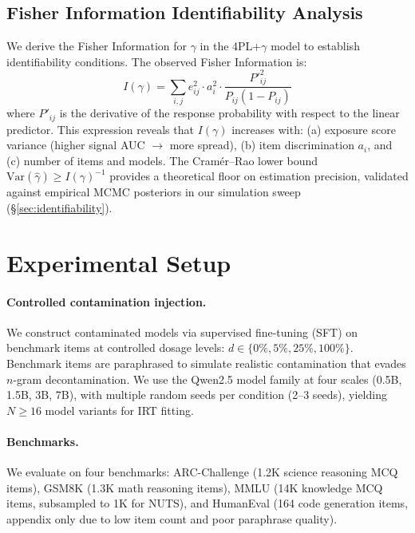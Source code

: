 \documentclass[11pt,a4paper]{article}
\newcommand{\gammahat}{\hat{\gamma}}
\begin{document}
\subsection{Fisher Information Identifiability Analysis}

We derive the Fisher Information for $\gamma$ in the 4PL+$\gamma$ model to establish identifiability conditions. The observed Fisher Information is:
\begin{equation}
I(\gamma) = \sum_{i,j} e_{ij}^2 \cdot a_i^2 \cdot \frac{P'_{ij}^2}{P_{ij}(1-P_{ij})}
\end{equation}
where $P'_{ij}$ is the derivative of the response probability with respect to the linear predictor. This expression reveals that $I(\gamma)$ increases with: (a) exposure score variance (higher signal AUC $\to$ more spread), (b) item discrimination $a_i$, and (c) number of items and models. The Cram\'{e}r--Rao lower bound $\text{Var}(\gammahat) \geq I(\gamma)^{-1}$ provides a theoretical floor on estimation precision, validated against empirical MCMC posteriors in our simulation sweep (\S\ref{sec:identifiability}).

\section{Experimental Setup}
\label{sec:setup}

\paragraph{Controlled contamination injection.}
We construct contaminated models via supervised fine-tuning (SFT) on benchmark items at controlled dosage levels: $d \in \{0\%, 5\%, 25\%, 100\%\}$. Benchmark items are paraphrased to simulate realistic contamination that evades $n$-gram decontamination. We use the Qwen2.5 model family at four scales (0.5B, 1.5B, 3B, 7B), with multiple random seeds per condition (2--3 seeds), yielding $N\geq16$ model variants for IRT fitting.

\paragraph{Benchmarks.}
We evaluate on four benchmarks: ARC-Challenge (1.2K science reasoning MCQ items), GSM8K (1.3K math reasoning items), MMLU (14K knowledge MCQ items, subsampled to 1K for NUTS), and HumanEval (164 code generation items, appendix only due to low item count and poor paraphrase quality).
\end{document}
